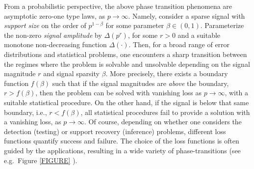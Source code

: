 From a probabilistic perspective, the above phase transition phenomena are asymptotic zero-one type laws, as $p\to\infty$.  
Namely, consider a sparse signal with  {\em support size} on the order of $p^{1-\beta}$ for some parameter $\beta\in (0,1)$.  
Parameterize the non-zero {\em signal amplitude} by $\Delta(p^r)$, 
for some $r>0$ and a suitable monotone non-decreasing function $\Delta(\cdot)$.  Then, for a broad range of error distributions and
statistical problems, one encounters a sharp transition between the regimes where the problem is solvable and unsolvable depending on 
the signal magnitude $r$ and signal sparsity $\beta$.  More precisely, there exists a boundary function $f(\beta)$ such that if 
the signal magnitudes are {\em above} the boundary, $r> f(\beta)$, then the problem can be solved with vanishing loss as $p\to\infty$, with a suitable statistical procedure.  On the other hand, if the signal is below that same boundary, i.e., $r<f(\beta)$, all statistical procedures fail to  provide a solution with a vanishing loss, as $p\to\infty$. Of course, depending on whether one considers the  detection (testing) or support recovery 
(inference) problems, different loss functions quantify success and failure. The choice of the loss functions is often guided by the 
applications, resulting in a wide variety of phase-transitions (see e.g.\ Figure \ref{FIGURE} ).

